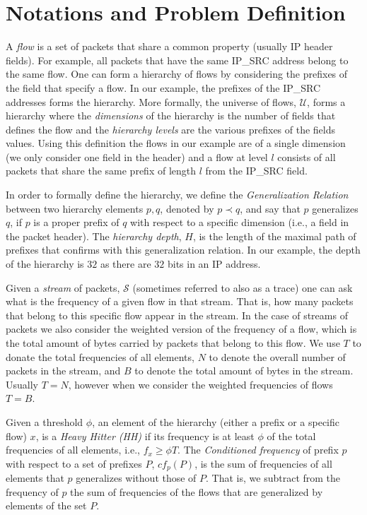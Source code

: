 \section{Notations and Problem Definition}

A  \textit{flow} is a set of packets that share a common property (usually IP header fields).  For example, all packets that have the same IP\_SRC address belong to the same flow. One can form a hierarchy of flows by considering  the prefixes  of the field that specify a flow. In our example, the prefixes of the IP\_SRC addresses forms the hierarchy.  More formally,  the   universe of flows, $\mathcal U$, forms a hierarchy where the \textit{dimensions} of the hierarchy is the number of fields that defines the flow and the \textit{hierarchy levels} are the various prefixes of the fields values.  Using this definition the flows in our example are of a single dimension (we only consider one field in the header) and a flow at level $l$ consists of all packets that share the same prefix of length $l$ from the IP\_SRC field.

In order to formally define the hierarchy, we define the \textit{Generalization Relation} between two hierarchy elements $p,q$, denoted by $p \prec q$, and say that $p$ generalizes $q$, if $p$ is a proper prefix of $q$ with respect to a specific dimension (i.e., a field in the packet header).  The \textit{hierarchy depth}, $H$, is the length of the maximal path of prefixes that confirms with this generalization relation. In our example, the depth of the hierarchy is $32$ as there are $32$ bits in an IP address. 

Given a \textit{stream} of packets, $\mathcal S$ (sometimes referred to also as a trace) one can ask what is the frequency of a given flow in that stream. That is, how many packets that belong to this specific flow appear in the stream. In the case of streams of packets we also consider the weighted version of the frequency of a flow, which is the total amount of bytes carried by packets that belong to this flow.  We use $T$ to donate the total frequencies of all elements, $N$ to denote the overall number of packets in the stream, and $B$ to denote the total amount of bytes in the stream. Usually $T=N$, however when we consider the weighted frequencies of flows $T=B$.

Given a threshold $\phi$, an element of the hierarchy (either a prefix or a specific flow) $x$, is a \textit{Heavy Hitter (HH)} if its frequency is at least $\phi$ of the total frequencies of all elements, i.e., $f_x \geq \phi T$. The \textit{Conditioned frequency} of prefix $p$ with respect to a set of prefixes $P$, $cf_p(P)$, is the sum of frequencies of all elements that $p$ generalizes without those of $P$. That is, we subtract from the frequency of $p$ the sum of frequencies of the flows that are generalized by elements of the set $P$.

